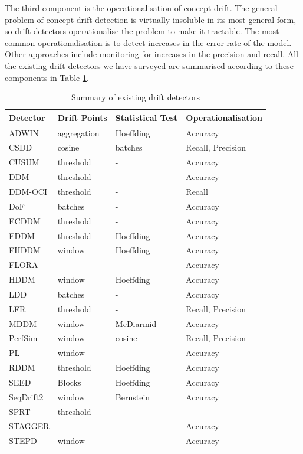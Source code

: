 The third component is the operationalisation of concept drift. The general problem of concept drift detection is virtually insoluble in its most general form, so drift detectors operationalise the problem to make it tractable. The most common operationalisation is to detect increases in the error rate of the model. Other approaches include monitoring for increases in the precision and recall.
All the existing drift detectors we have surveyed are summarised according to these components in Table \ref{tab:drift_detectors}.

\begin{table}[]
    \centering
    \caption{Summary of existing drift detectors}
    \label{tab:drift_detectors}
    \begin{tabular}{|l|l|l|l|}
         \toprule
         Detector & Drift Points & Statistical Test & Operationalisation  \\
         \midrule
         ADWIN & aggregation & Hoeffding & Accuracy \\
         CSDD & cosine & batches & Recall, Precision \\
         CUSUM & threshold & - & Accuracy \\
         DDM & threshold & - & Accuracy \\
         DDM-OCI & threshold & - & Recall \\
         DoF & batches & - & Accuracy \\
         ECDDM & threshold & - & Accuracy \\
         EDDM & threshold & Hoeffding & Accuracy \\
         FHDDM & window & Hoeffding & Accuracy \\
         FLORA & - & - & Accuracy \\
         HDDM & window & Hoeffding & Accuracy \\ 
         LDD & batches & - & Accuracy \\
         LFR & threshold & - & Recall, Precision  \\
         MDDM & window & McDiarmid & Accuracy \\
         PerfSim & window & cosine & Recall, Precision \\
         PL & window & - & Accuracy \\
         RDDM & threshold & Hoeffding & Accuracy \\
         SEED & Blocks & Hoeffding & Accuracy \\ 
         SeqDrift2 & window & Bernstein & Accuracy \\
         SPRT & threshold & - & - \\
         STAGGER & - & - & Accuracy \\
         STEPD & window & - & Accuracy \\
         \bottomrule
    \end{tabular}
\end{table}








